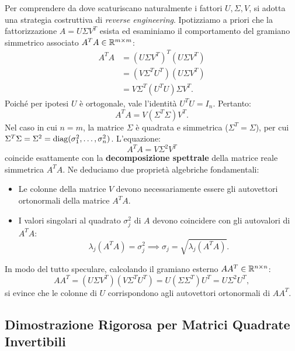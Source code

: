 Per comprendere da dove scaturiscano naturalmente i fattori $U, \Sigma, V$, si adotta una strategia costruttiva di \textit{reverse engineering}. Ipotizziamo a priori che la fattorizzazione $A = U \Sigma V^T$ esista ed esaminiamo il comportamento del gramiano simmetrico associato $A^T A \in \mathbb{R}^{m \times m}$:
\begin{align}
    A^T A &= (U \Sigma V^T)^T (U \Sigma V^T) \nonumber \\
          &= (V \Sigma^T U^T)(U \Sigma V^T) \nonumber \\
          &= V \Sigma^T (U^T U) \Sigma V^T.
\end{align}
Poich\'e per ipotesi $U$ \`e ortogonale, vale l'identit\`a $U^T U = I_n$. Pertanto:
\begin{equation}
    A^T A = V (\Sigma^T \Sigma) V^T.
\end{equation}
Nel caso in cui $n = m$, la matrice $\Sigma$ \`e quadrata e simmetrica ($\Sigma^T = \Sigma$), per cui $\Sigma^T \Sigma = \Sigma^2 = \operatorname{diag}(\sigma_1^2, \dots, \sigma_n^2)$. 
L'equazione:
\begin{equation}
    A^T A = V \Sigma^2 V^T
\end{equation}
coincide esattamente con la \textbf{decomposizione spettrale} della matrice reale simmetrica $A^T A$. Ne deduciamo due propriet\`a algebriche fondamentali:
\begin{itemize}
    \item Le colonne della matrice $V$ devono necessariamente essere gli autovettori ortonormali della matrice $A^T A$.
    \item I valori singolari al quadrato $\sigma_j^2$ di $A$ devono coincidere con gli autovalori di $A^T A$:
    \begin{equation}
        \lambda_j(A^T A) = \sigma_j^2 \implies \sigma_j = \sqrt{\lambda_j(A^T A)}.
    \end{equation}
\end{itemize}

In modo del tutto speculare, calcolando il gramiano esterno $A A^T \in \mathbb{R}^{n \times n}$:
\begin{equation}
    A A^T = (U \Sigma V^T)(V \Sigma^T U^T) = U (\Sigma \Sigma^T) U^T = U \Sigma^2 U^T,
\end{equation}
si evince che le colonne di $U$ corrispondono agli autovettori ortonormali di $A A^T$.

\subsection{Dimostrazione Rigorosa per Matrici Quadrate Invertibili}

